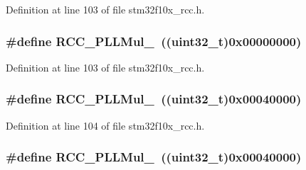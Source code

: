 Definition at line 103 of file stm32f10x\+\_\+rcc.\+h.

\subsubsection[{\texorpdfstring{R\+C\+C\+\_\+\+P\+L\+L\+Mul\+\_\+2}{RCC_PLLMul_2}}]{\setlength{\rightskip}{0pt plus 5cm}\#define R\+C\+C\+\_\+\+P\+L\+L\+Mul\+\_~(({\bf uint32\+\_\+t})0x00000000)}\hypertarget{group___p_l_l__multiplication__factor_ga91b3b28fa4d56693d1eb361e24f317af}{}\label{group___p_l_l__multiplication__factor_ga91b3b28fa4d56693d1eb361e24f317af}


Definition at line 103 of file stm32f10x\+\_\+rcc.\+h.

\subsubsection[{\texorpdfstring{R\+C\+C\+\_\+\+P\+L\+L\+Mul\+\_\+3}{RCC_PLLMul_3}}]{\setlength{\rightskip}{0pt plus 5cm}\#define R\+C\+C\+\_\+\+P\+L\+L\+Mul\+\_~(({\bf uint32\+\_\+t})0x00040000)}\hypertarget{group___p_l_l__multiplication__factor_gafc2dd6c503b9ee6e0cfbec6d7d3a3e00}{}\label{group___p_l_l__multiplication__factor_gafc2dd6c503b9ee6e0cfbec6d7d3a3e00}


Definition at line 104 of file stm32f10x\+\_\+rcc.\+h.

\subsubsection[{\texorpdfstring{R\+C\+C\+\_\+\+P\+L\+L\+Mul\+\_\+3}{RCC_PLLMul_3}}]{\setlength{\rightskip}{0pt plus 5cm}\#define R\+C\+C\+\_\+\+P\+L\+L\+Mul\+\_~(({\bf uint32\+\_\+t})0x00040000)}\hypertarget{group___p_l_l__multiplication__factor_gafc2dd6c503b9ee6e0cfbec6d7d3a3e00}{}\label{group___p_l_l__multiplication__factor_gafc2dd6c503b9ee6e0cfbec6d7d3a3e00}


